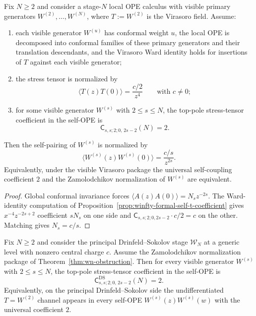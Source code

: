\begin{proposition}
\label{prop:winfty-formal-self-normalization-from-t}
Fix $N \ge 2$ and consider a stage-$N$ local OPE calculus with visible
primary generators $W^{(2)},\dots,W^{(N)}$, where
$T:=W^{(2)}$ is the Virasoro field. Assume:
\begin{enumerate}[label=\textup{(\roman*)}]
\item each visible generator $W^{(u)}$ has conformal weight $u$, the
 local OPE is decomposed into conformal families of these primary
 generators and their translation descendants, and the Virasoro Ward
 identity holds for insertions of $T$ against each visible generator;
\item the stress tensor is normalized by
 \[
 \langle T(z)T(0)\rangle=\frac{c/2}{z^4}
 \qquad\text{with } c\neq 0;
 \]
\item for some visible generator $W^{(s)}$ with $2 \le s \le N$, the
 top-pole stress-tensor coefficient in the self-OPE is
 \[
 \mathsf{C}_{s,s;2;0,\,2s-2}(N)=2.
 \]
\end{enumerate}
Then the self-pairing of $W^{(s)}$ is normalized by
\[
\langle W^{(s)}(z)W^{(s)}(0)\rangle=\frac{c/s}{z^{2s}}.
\]
Equivalently, under the visible Virasoro package the universal
self-coupling coefficient $2$ and the Zamolodchikov normalization of
$W^{(s)}$ are equivalent.
\end{proposition}

\begin{proof}
Global conformal invariance forces $\langle A(z)A(0)\rangle = N_s z^{-2s}$. The Ward-identity computation of Proposition~\ref{prop:winfty-formal-self-t-coefficient} gives $x^{-4}z^{-2s+2}$ coefficient $sN_s$ on one side and $\mathsf{C}_{s,s;2;0,2s-2}\cdot c/2 = c$ on the other. Matching gives $N_s = c/s$.
\end{proof}

\begin{proposition}
\label{prop:winfty-ds-self-t-coefficient}
Fix $N \ge 2$ and consider the principal Drinfeld--Sokolov stage
$\mathcal{W}_N$ at a generic level with nonzero central charge $c$.
Assume the Zamolodchikov normalization package of
Theorem~\ref{thm:wn-obstruction}. Then for every visible generator
$W^{(s)}$ with $2 \le s \le N$, the top-pole stress-tensor coefficient
in the self-OPE is
\[
\mathsf{C}^{\mathrm{DS}}_{s,s;2;0,\,2s-2}(N)=2.
\]
Equivalently, on the principal Drinfeld--Sokolov side the
undifferentiated $T=W^{(2)}$ channel appears in every self-OPE
$W^{(s)}(z)W^{(s)}(w)$ with the universal coefficient $2$.
\end{proposition}

